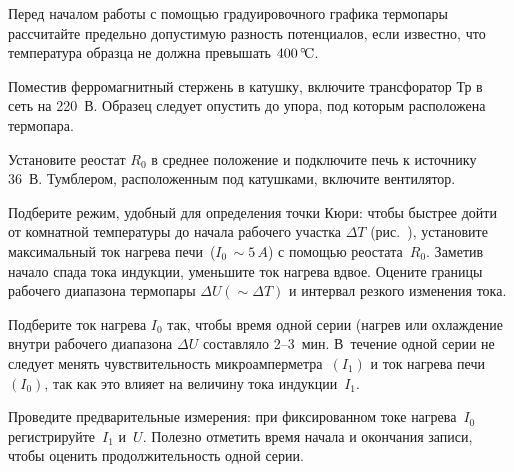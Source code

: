 \begin{lab:task}


\item
  \label{item:1}
  Перед началом работы с помощью градуировочного графика термопары рассчитайте
предельно допустимую разность потенциалов, если известно, что температура
образца не должна превышать $400\,^\circ\!\mathrm{C}$.

\item \label{p:43:2}
  Поместив ферромагнитный стержень в катушку, включите трансфоратор $\text{Тр}$
в сеть на 220~В. Образец следует опустить до упора, под которым расположена
термопара.


\item
  Установите реостат $R_0$ в среднее положение и подключите печь к ис­точнику
36~В. Тумблером, расположенным под катушками, включите вентилятор.

\item
  Подберите режим, удобный для определения точки Кюри: чтобы быстрее дойти от
комнатной температуры до начала рабочего участка $\Delta T$
(рис.~), установите максимальный
ток нагрева печи~($I_0\,\sim5\,A$) с помощью реостата~$R_0$. Заметив начало
спада тока индукции, уменьшите ток нагрева вдвое. Оцените границы рабочего
диапазона термопары $\Delta U (\sim\Delta T)$ и интервал резкого изменения
тока. 


\item 
Подберите ток нагрева $I_0$ так, чтобы время одной серии (нагрев или охлаждение
внутри рабочего диапазона $\Delta U$ составляло 2--3~мин. В~течение одной
серии не следует менять чувствительность микроамперметра~$(I_1)$ и ток нагрева
печи~$(I_0)$, так как это влияет на величину тока индукции~$I_1$.

\item 
Проведите предварительные измерения: при фиксированном токе нагрева~$I_0$
регистрируйте~$I_1$ и~$U$. Полезно отметить время начала и окончания
записи, чтобы оценить продолжительность одной серии.


\end{lab:task}
